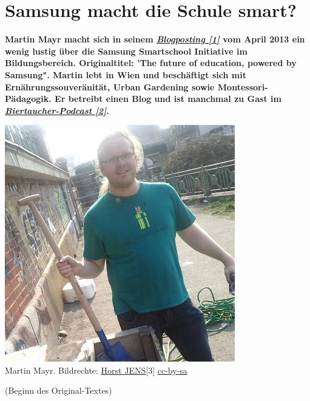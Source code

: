 \section*{Samsung macht die Schule smart?}
\label{smartschool}

\textbf{Martin Mayr macht sich in seinem \href{http://martinslangweiligesblog.wordpress.com/2013/04/01/the-future-of-education-powered-by-samsung/}{\textit{Blogposting [1]}} vom April 2013 ein wenig lustig über die Samsung Smartschool Initiative im Bildungsbereich. Originaltitel: 'The future of education, powered by Samsung". Martin lebt in Wien und beschäftigt sich mit Ernährungssouveränität, Urban Gardening sowie Montessori-Pädagogik. Er betreibt einen Blog und ist manchmal zu Gast im \href{http://biertaucher.at}{\textit{Biertaucher-Podcast [2]}}.}

\begin{center}
\includegraphics[width=\linewidth]{smartschool/martinderm2.jpg} \\
\footnotesize{Martin Mayr. Bildrechte: \href{http://spielend-programmieren.at}{Horst JENS}[3] \href{http://creativecommons.org/licenses/by-sa/3.0/}{cc-by-sa}}
\end{center}

(Beginn des Original-Textes)\\

